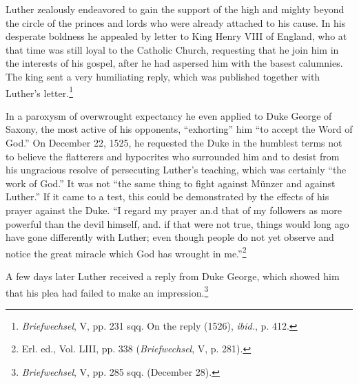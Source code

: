 Luther zealously endeavored to gain the support of the high and
mighty beyond the circle of the princes and lords who were already
attached to his cause. In his desperate boldness he appealed by letter
to King Henry VIII of England, who at that time was still loyal to
the Catholic Church, requesting that he join him in the interests of
his gospel, after he had aspersed him with the basest calumnies. The
king sent a very humiliating reply, which was published together
with Luther’s letter.\footnote
{\textit{Briefwechsel}, V, pp. 231 sqq. On the reply (1526), \textit{ibid.}, p. 412.}

In a paroxysm of overwrought expectancy he even applied to Duke
George of Saxony, the most active of his opponents, “exhorting” him
“to accept the Word of God.” On December 22, 1525, he requested
the Duke in the humblest terms not to believe the flatterers and hypocrites
who surrounded him and to desist from his ungracious resolve
of persecuting Luther’s teaching, which was certainly “the work of
God.” It was not “the same thing to fight against Münzer and
against Luther.” If it came to a test, this could be demonstrated by
the effects of his prayer against the Duke. “I regard my prayer an.d
that of my followers as more powerful than the devil himself, and. if
that were not true, things would long ago have gone differently with
Luther; even though people do not yet observe and notice the great
miracle which God has wrought in me.”\footnote{Erl. ed., Vol. LIII, pp. 338 (\textit{Briefwechsel}, V, p. 281).}

A few days later Luther received a reply from Duke George, which
showed him that his plea had failed to make an impression.\footnote
{\textit{Briefwechsel}, V, pp. 285 sqq. (December 28).}

